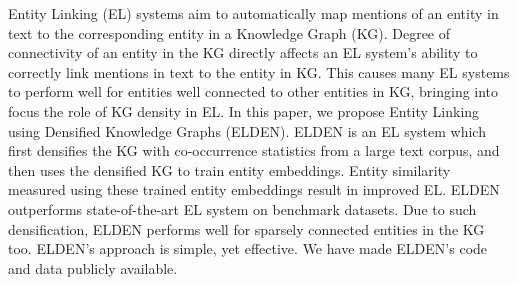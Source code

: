 Entity Linking (EL) systems aim to automatically map mentions of an entity in text to the corresponding entity in a Knowledge Graph (KG). Degree of connectivity of an entity in the KG directly affects an EL system's ability to correctly link mentions in text to the entity in KG. This causes many EL systems to perform well for entities well connected to other entities in KG, bringing into focus the role of KG density in EL. In this paper, we propose Entity Linking using Densified Knowledge Graphs (ELDEN). ELDEN is an EL system which first densifies the KG with co-occurrence statistics from a large text corpus, and then uses the densified KG to train entity embeddings. Entity similarity measured using these trained entity embeddings result in improved EL. ELDEN outperforms state-of-the-art EL system on benchmark datasets. Due to such densification, ELDEN performs well for sparsely connected entities in the KG too. ELDEN's approach is simple, yet effective. We have made ELDEN's code and data publicly available.
